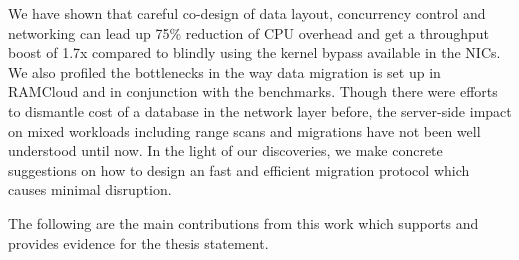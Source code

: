 We have shown that careful co-design of data layout, concurrency control
and networking can lead up 75\% reduction of CPU overhead and  get a throughput
boost of 1.7x compared to blindly using the kernel bypass available
in the NICs. We also profiled the bottlenecks in the way data migration is set up
in RAMCloud and in conjunction with the benchmarks. Though there were efforts to 
dismantle cost of a database in the network layer before, the server-side impact
on mixed workloads including range scans and migrations have not been well understood
until now. In the light of our discoveries, we make concrete suggestions on how
 to design an fast and efficient migration 
protocol which causes minimal disruption.

The following are the main contributions from this work which supports and provides
evidence for the thesis statement.

